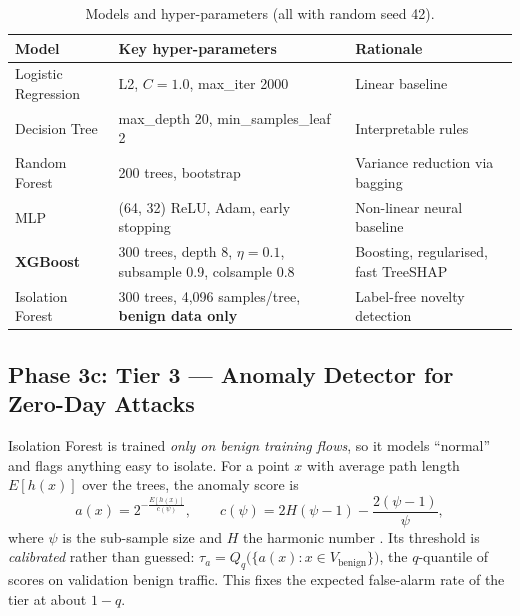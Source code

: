\documentclass[12pt,a4paper,oneside]{article}
\begin{document}
\begin{table}[H]\centering\small
\caption{Models and hyper-parameters (all with random seed 42).}\label{tab:hyper}
\begin{tabularx}{\linewidth}{l Y Y}
\toprule
\textcolor{rblue}{Model} & \textcolor{rblue}{Key hyper-parameters} & \textcolor{rblue}{Rationale} \\ \midrule
Logistic Regression & L2, $C=1.0$, max\_iter 2000 & Linear baseline \\
Decision Tree & max\_depth 20, min\_samples\_leaf 2 & Interpretable rules \\
Random Forest \cite{breiman2001random} & 200 trees, bootstrap & Variance reduction via bagging \\
MLP & (64, 32) ReLU, Adam, early stopping & Non-linear neural baseline \\
\textbf{XGBoost} \cite{chen2016xgboost} & 300 trees, depth 8, $\eta=0.1$, subsample 0.9, colsample 0.8 & Boosting, regularised, fast TreeSHAP \\
Isolation Forest \cite{liu2008isolation} & 300 trees, 4{,}096 samples/tree, \textbf{benign data only} & Label-free novelty detection \\
\bottomrule
\end{tabularx}
\end{table}

\subsection{Phase 3c: Tier 3 --- Anomaly Detector for Zero-Day Attacks}
Isolation Forest is trained \emph{only on benign training flows}, so it models ``normal'' and flags anything easy to isolate. For a point $x$ with average path length $E[h(x)]$ over the trees, the anomaly score is
\begin{equation}
a(x) = 2^{-\frac{E[h(x)]}{c(\psi)}},\qquad c(\psi)=2H(\psi-1)-\frac{2(\psi-1)}{\psi},
\end{equation}
where $\psi$ is the sub-sample size and $H$ the harmonic number \cite{liu2008isolation}. Its threshold is \emph{calibrated} rather than guessed: $\tau_a = Q_q\big(\{a(x): x\in V_{\text{benign}}\}\big)$, the $q$-quantile of scores on validation benign traffic. This fixes the expected false-alarm rate of the tier at about $1-q$.
\end{document}
